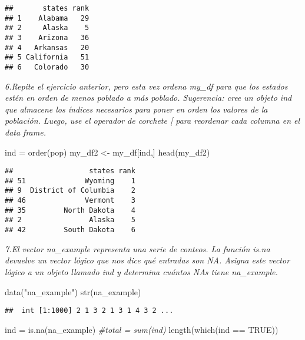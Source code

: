 \documentclass[
]{article}
\newenvironment{Shaded}{\begin{snugshade}}{\end{snugshade}}
\newcommand{\CommentTok}[1]{\textcolor[rgb]{0.56,0.35,0.01}{\textit{#1}}}
\newcommand{\ConstantTok}[1]{\textcolor[rgb]{0.00,0.00,0.00}{#1}}
\newcommand{\FunctionTok}[1]{\textcolor[rgb]{0.00,0.00,0.00}{#1}}
\newcommand{\NormalTok}[1]{#1}
\newcommand{\OtherTok}[1]{\textcolor[rgb]{0.56,0.35,0.01}{#1}}
\newcommand{\SpecialCharTok}[1]{\textcolor[rgb]{0.00,0.00,0.00}{#1}}
\newcommand{\StringTok}[1]{\textcolor[rgb]{0.31,0.60,0.02}{#1}}
\begin{document}
\begin{verbatim}
##       states rank
## 1    Alabama   29
## 2     Alaska    5
## 3    Arizona   36
## 4   Arkansas   20
## 5 California   51
## 6   Colorado   30
\end{verbatim}

\emph{6.Repite el ejercicio anterior, pero esta vez ordena my\_df para
que los estados estén en orden de menos poblado a más poblado.
Sugerencia: cree un objeto ind que almacene los índices necesarios para
poner en orden los valores de la población. Luego, use el operador de
corchete {[} para reordenar cada columna en el data frame.}

\begin{Shaded}
\begin{Highlighting}[]
\NormalTok{ind }\OtherTok{=} \FunctionTok{order}\NormalTok{(pop)}
\NormalTok{my\_df2 }\OtherTok{\textless{}{-}}\NormalTok{ my\_df[ind,]}
\FunctionTok{head}\NormalTok{(my\_df2)}
\end{Highlighting}
\end{Shaded}

\begin{verbatim}
##                  states rank
## 51              Wyoming    1
## 9  District of Columbia    2
## 46              Vermont    3
## 35         North Dakota    4
## 2                Alaska    5
## 42         South Dakota    6
\end{verbatim}

\emph{7.El vector na\_example representa una serie de conteos. La
función is.na devuelve un vector lógico que nos dice qué entradas son
NA. Asigna este vector lógico a un objeto llamado ind y determina
cuántos NAs tiene na\_example.}

\begin{Shaded}
\begin{Highlighting}[]
\FunctionTok{data}\NormalTok{(}\StringTok{"na\_example"}\NormalTok{)}
\FunctionTok{str}\NormalTok{(na\_example)}
\end{Highlighting}
\end{Shaded}

\begin{verbatim}
##  int [1:1000] 2 1 3 2 1 3 1 4 3 2 ...
\end{verbatim}

\begin{Shaded}
\begin{Highlighting}[]
\NormalTok{ind }\OtherTok{=} \FunctionTok{is.na}\NormalTok{(na\_example)}
\CommentTok{\#total = sum(ind)}
\FunctionTok{length}\NormalTok{(}\FunctionTok{which}\NormalTok{(ind }\SpecialCharTok{==} \ConstantTok{TRUE}\NormalTok{))}
\end{Highlighting}
\end{Shaded}
\end{document}

